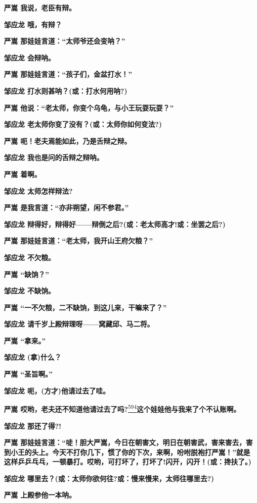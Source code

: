 \textbf{严嵩 我说，老臣有辩。}

\textbf{邹应龙 哦，有辩？}

\textbf{严嵩 那娃娃言道：``太师爷还会变呐？''}

\textbf{邹应龙 会辩呐。}

\textbf{严嵩 那娃娃言道：``孩子们，金盆打水！''}

\textbf{邹应龙 打水则甚呐？(或：打水何用呐?)}

\textbf{严嵩 他说：``老太师，你变个乌龟，与小王玩耍玩耍？''}

\textbf{邹应龙 老太师你变了没有？(或：太师你如何变法?)}

\textbf{严嵩 呃！老夫焉能如此，乃是舌辩之辩。}

\textbf{邹应龙 我也是问的舌辩之辩呐。}

\textbf{严嵩 着啊。}

\textbf{邹应龙 太师怎样辩法?}

\textbf{严嵩 是我言道：``亦非朔望，闲不参君。''}

\textbf{邹应龙
辩得好，辩得好------辩倒之后?(或：老太师高才!或：坐罢之后?)}

\textbf{严嵩 那娃娃言道：``老太师，我开山王府欠粮？''}

\textbf{邹应龙 不欠粮。}

\textbf{严嵩 ``缺饷？''}

\textbf{邹应龙 不缺饷。}

\textbf{严嵩 ``一不欠粮，二不缺饷，到这儿来，干嘛来了？''}

\textbf{邹应龙 请千岁上殿辩理呀------窝藏邱、马二将。}

\textbf{严嵩 ``拿来。''}

\textbf{邹应龙 (拿)什么？}

\textbf{严嵩 ``圣旨啊。''}

\textbf{邹应龙 呃，(方才)他请过去了哇。}

\textbf{严嵩
哎哟，老夫还不知道他请过去了吗?}\protect\hyperlink{fn594}{\textsuperscript{594}}\textbf{这个娃娃他与我来了个不认账啊。}

\textbf{邹应龙 那还了得?!}

\textbf{严嵩
那娃娃言道：``唗！胆大严嵩，今日在朝害文，明日在朝害武，害来害去，害到小王的头上。今天不打你几下，惯了你的下次，来啊，吩咐脱袍打严嵩！''就是这样乒乒乓乓，一顿暴打。哎哟，可打坏了，打坏了!闪开，闪开！(或：搀扶了。)}

\textbf{邹应龙 哪里去？(或：太师你欲何往?或：慢来慢来，太师往哪里去?)}

\textbf{严嵩 上殿参他一本呐。}

